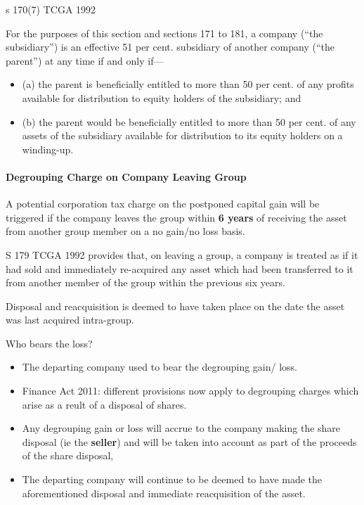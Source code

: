 \documentclass[
]{article}
\providecommand{\tightlist}{%
  \setlength{\itemsep}{0pt}\setlength{\parskip}{0pt}}
\newenvironment{env-b668fda5-661a-4463-a3e4-043f904202e1}
{
    \savenotes\tcolorbox[blanker,breakable,left=5pt,borderline west={2pt}{-4pt}{green}]
}
{
    \endtcolorbox\spewnotes
}
\newenvironment{env-cd9ec69d-b412-4d96-9cef-e157a91791ae}
{
    \savenotes\tcolorbox[blanker,breakable,left=5pt,borderline west={2pt}{-4pt}{gray}]
}
{
    \endtcolorbox\spewnotes
}
\begin{document}
\begin{env-b668fda5-661a-4463-a3e4-043f904202e1}

s 170(7) TCGA 1992

For the purposes of this section and sections 171 to 181, a company
(``the subsidiary'') is an effective 51 per cent. subsidiary of another
company (``the parent'') at any time if and only if---

\begin{itemize}
\item
  (a) the parent is beneficially entitled to more than 50 per cent. of
  any profits available for distribution to equity holders of the
  subsidiary; and
\item
  (b) the parent would be beneficially entitled to more than 50 per
  cent. of any assets of the subsidiary available for distribution to
  its equity holders on a winding-up.
\end{itemize}

\end{env-b668fda5-661a-4463-a3e4-043f904202e1}

\hypertarget{degrouping-charge-on-company-leaving-group}{%
\paragraph{Degrouping Charge on Company Leaving
Group}\label{degrouping-charge-on-company-leaving-group}}

A potential corporation tax charge on the postponed capital gain will be
triggered if the company leaves the group within \textbf{6 years} of
receiving the asset from another group member on a no gain/no loss
basis.

S 179 TCGA 1992 provides that, on leaving a group, a company is treated
as if it had sold and immediately re-acquired any asset which had been
transferred to it from another member of the group within the previous
six years.

Disposal and reacquisition is deemed to have taken place on the date the
asset was last acquired intra-group.

\begin{env-cd9ec69d-b412-4d96-9cef-e157a91791ae}

Who bears the loss?

\begin{itemize}
\tightlist
\item
  The departing company used to bear the degrouping gain/ loss.
\item
  Finance Act 2011: different provisions now apply to degrouping charges
  which arise as a reult of a disposal of shares.
\item
  Any degrouping gain or loss will accrue to the company making the
  share disposal (ie the \textbf{seller}) and will be taken into account
  as part of the proceeds of the share disposal,
\item
  The departing company will continue to be deemed to have made the
  aforementioned disposal and immediate reacquisition of the asset.
\end{itemize}

\end{env-cd9ec69d-b412-4d96-9cef-e157a91791ae}
\end{document}
